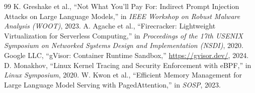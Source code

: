 \documentclass[10pt,twocolumn,a4paper]{article}
\begin{document}
\begin{thebibliography}{99}
 K. Greshake et al., ``Not What You'll Pay For: Indirect Prompt Injection Attacks on Large Language Models,'' in \emph{IEEE Workshop on Robust Malware Analysis (WOOT)}, 2023.
 A. Agache et al., ``Firecracker: Lightweight Virtualization for Serverless Computing,'' in \emph{Proceedings of the 17th USENIX Symposium on Networked Systems Design and Implementation (NSDI)}, 2020.
 Google LLC, ``gVisor: Container Runtime Sandbox,'' \url{https://gvisor.dev/}, 2024.
 D. Monakhov, ``Linux Kernel Tracing and Security Enforcement with eBPF,'' in \emph{Linux Symposium}, 2020.
 W. Kwon et al., ``Efficient Memory Management for Large Language Model Serving with PagedAttention,'' in \emph{SOSP}, 2023.
\end{thebibliography}
\end{document}
